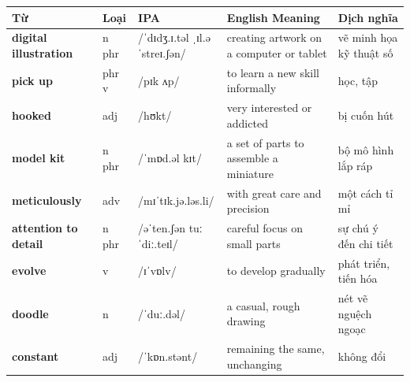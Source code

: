 \vspace{0.8em}
\begin{center}
\renewcommand{\arraystretch}{1.65}
\begin{tabularx}{\textwidth}{|V{0.22\textwidth}|C{0.07\textwidth}|I{0.20\textwidth}|Y|V{0.18\textwidth}|}
\hline
{}
\textbf{Từ} & \textbf{Loại} & \textbf{IPA} & \textbf{English Meaning} & \textbf{Dịch nghĩa} \\
\hline
\textbf{digital illustration} & n phr & /ˈdɪdʒ.ɪ.təl ˌɪl.əˈstreɪ.ʃən/ & creating artwork on a computer or tablet & vẽ minh họa kỹ thuật số \\ \hline
\textbf{pick up} & phr v & /pɪk ʌp/ & to learn a new skill informally & học, tập \\ \hline
\textbf{hooked} & adj & /hʊkt/ & very interested or addicted & bị cuốn hút \\ \hline
\textbf{model kit} & n phr & /ˈmɒd.əl kɪt/ & a set of parts to assemble a miniature & bộ mô hình lắp ráp \\ \hline
\textbf{meticulously} & adv & /mɪˈtɪk.jə.ləs.li/ & with great care and precision & một cách tỉ mỉ \\ \hline
\textbf{attention to detail} & n phr & /əˈten.ʃən tuː ˈdiː.teɪl/ & careful focus on small parts & sự chú ý đến chi tiết \\ \hline
\textbf{evolve} & v & /ɪˈvɒlv/ & to develop gradually & phát triển, tiến hóa \\ \hline
\textbf{doodle} & n & /ˈduː.dəl/ & a casual, rough drawing & nét vẽ nguệch ngoạc \\ \hline
\textbf{constant} & adj & /ˈkɒn.stənt/ & remaining the same, unchanging & không đổi \\ \hline
\end{tabularx}
\end{center}

\newpage

